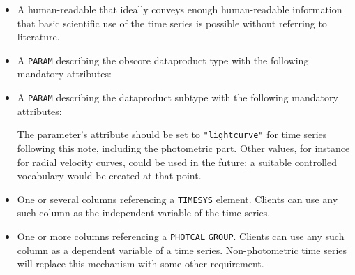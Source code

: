\documentclass[11pt,a4paper]{ivoa} 
\let\fg=\color
\def\elem#1{{\tt{\fg{DarkRed}#1}}}
\def\attrval#1#2{{\tt{\fg{DarkRed}#1}="{\fg{DarkPurple}#2}"}}
\def\attrvalonly#1{{\tt"{\fg{DarkPurple}#1}"}}
\begin{document}
\begin{itemize}
\item A human-readable  that ideally conveys enough
  human-readable information that basic scientific use of the time
  series is possible without referring to literature.

\item A \elem{PARAM} describing the obscore dataproduct type with the
  following mandatory attributes:

\item A \elem{PARAM} describing the dataproduct subtype with the
  following mandatory attributes:


The parameter's  attribute should be set to
\attrvalonly{lightcurve} for time series following this note, including the
photometric part.  Other values, for instance for radial velocity
curves, could be used in the future; a suitable controlled vocabulary
would be created at that point.

     \item One or several columns referencing a \elem{TIMESYS}
       element.  Clients can use any such column as the independent
       variable of the time series.

     \item One or more columns referencing a \texttt{PHOTCAL}
       \elem{GROUP}.  Clients can use any such column as a dependent
       variable of a time series.  Non-photometric time series will
       replace this mechanism with some other requirement.
\end{itemize}
\end{document}
